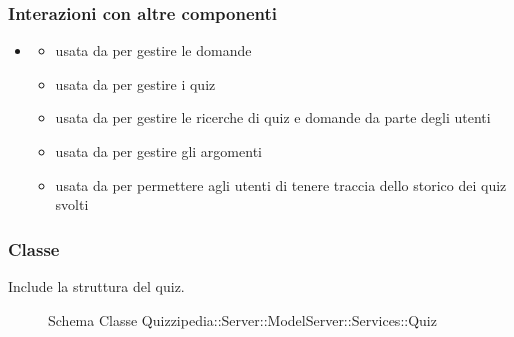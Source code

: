 \subsubsection{Interazioni con altre componenti}
\begin{itemize}
\item {}
\begin{itemize}
\item usata da  per gestire le domande
\item usata da  per gestire i quiz
\item usata da  per gestire le ricerche di quiz e domande da parte degli utenti
\item usata da  per gestire gli argomenti
\item usata da  per permettere agli utenti di tenere traccia dello storico dei quiz svolti
\end{itemize}
\end{itemize}
\subsubsection{Classe }
Include la struttura del quiz.
\begin{figure}[H]
\centering
\noindent{}
\caption[Schema Classe Quiz]{Schema Classe Quizzipedia::Server::ModelServer::Services::Quiz}
\end{figure}
